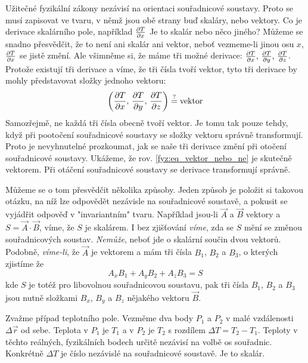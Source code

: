     Užitečné fyzikální zákony nezávisí na orientaci souřadnicové soustavy. Proto se musí zapisovat 
    ve tvaru, v němž jsou obě strany buď skaláry, nebo vektory. Co je derivace skalárního pole, 
    například $\frac{\partial T}{\partial x}$ Je to skalár nebo něco jiného? Můžeme se snadno přesvědčit, že to není 
    ani skalár ani vektor, neboť vezmeme-li jinou osu $x$, $\frac{\partial T}{\partial x}$ se jistě změní. Ale 
    všimněme si, že máme tři možné derivace: $\frac{\partial T}{\partial x},\,\frac{\partial T}{\partial y},\,\frac{\partial T}{\partial z}$. Protože 
    existují tři derivace a víme, že tři čísla tvoří vektor, tyto tři derivace by mohly představovat 
    složky jednoho vektoru:
    \begin{equation}\label{fyz:eq_vektor_nebo_ne}
      \left(\frac{\partial T}{\partial x},\,\frac{\partial T}{\partial y},\,\frac{\partial T}{\partial z}\right)\overset{?}{=}\mathrm{vektor}
    \end{equation}
    Samozřejmě, ne každá tři čísla obecně tvoří vektor. Je tomu tak pouze tehdy, když při pootočení
    souřadnicové soustavy se složky vektoru správně transformují. Proto je nevyhnutelné prozkoumat, 
    jak se naše tři derivace změní při otočení souřadnicové soustavy. Ukážeme, že rov. 
    \ref{fyz:eq_vektor_nebo_ne} je skutečně vektorem. Při otáčení souřadnicové soustavy se derivace 
    transformují správně.
  
    Můžeme se o tom přesvědčit několika způsoby. Jeden způsob je položit si takovou otázku, na níž 
    lze odpovědět nezávisle na souřadnicové soustavě, a pokusit se vy\-já\-dřit odpověď v 
    "invariantním" tvaru. Například jsou-li $\vec{A}$ a  $\vec{B}$ vektory a 
    $S=\vec{A}\cdot\vec{B}$, víme, že $S$ je skalárem. I bez zjišťování \emph{víme}, zda se $S$ mění 
    se změnou souřadnicových soustav. \emph{Nemůže}, neboť jde o skalární součin dvou vektorů. 
    Podobně, \emph{víme-li}, že \(\vec{A}\) je vektorem a mám tři čísla \(B_1\), \(B_2\) a \(B_3\), 
    o kterých zjistíme že
    \begin{equation}\label{tepm:eq_skalarni_soucin}
      A_xB_1+A_yB_2+A_zB_3=S
    \end{equation}
    kde \(S\) je totéž pro libovolnou souřadnicovou soustavu, pak tři čísla $B_1$, $B_2$ a $B_3$ 
    jsou nutně složkami $B_x$, $B_y$ a $B_z$  nějakého vektoru $\vec{B}$.
  
    Zvažme případ teplotního pole. Vez\-mě\-me dva body $P_1$ a $P_2$ v malé vzdálenosti 
    $\Delta\vec{r}$ od sebe. Teplota v $P_1$ je $T_1$ a v $P_2$ je $T_2$ s rozdílem $\Delta 
    T=T_2-T_1$. Teploty v těchto reálných, fyzikálních bodech určitě nezávisí na volbě os souřadnic. 
    Konkrétně $\Delta T$ je číslo nezávislé na souřadnicové soustavě. Je to skalár.


